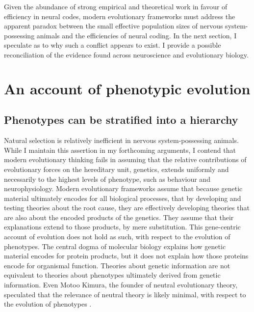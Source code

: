 \documentclass[twocolumn]{article}
\begin{document}

Given the abundance of strong empirical and theoretical work in favour of efficiency in neural codes, modern evolutionary frameworks must address the apparent paradox between the small effective population sizes of nervous system-possessing animals and the efficiencies of neural coding. In the next section, I speculate as to why such a conflict appears to exist. I provide a possible reconciliation of the evidence found across neuroscience and evolutionary biology. 

\section{An account of phenotypic evolution}

\subsection{Phenotypes can be stratified into a hierarchy}

Natural selection is relatively inefficient in nervous system-possessing animals. While I maintain this assertion in my forthcoming arguments, I contend that modern evolutionary thinking fails in assuming that the relative contributions of evolutionary forces on the hereditary unit, genetics, extends uniformly and necessarily to the highest levels of phenotype, such as behaviour and neurophysiology. Modern evolutionary frameworks assume that because genetic material ultimately encodes for all biological processes, that by developing and testing theories about the root cause, they are effectively developing theories that are also about the encoded products of the genetics. They assume that their explanations extend to those products, by mere substitution. This gene-centric account of evolution does not hold as such, with respect to the evolution of phenotypes. The central dogma of molecular biology \cite{crick_1970} explains how genetic material encodes for protein products, but it does not explain how those proteins encode for organismal function. Theories about genetic information are not equivalent to theories about phenotypes ultimately derived from genetic information. Even Motoo Kimura, the founder of neutral evolutionary theory, speculated that the relevance of neutral theory is likely minimal, with respect to the evolution of phenotypes \cite{kimura1983neutral, zhang_2018}. 
\end{document}
